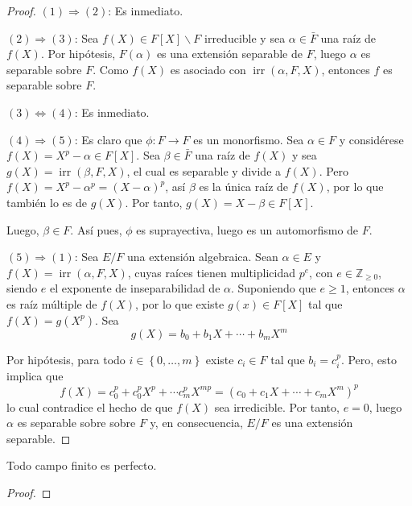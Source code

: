 \documentclass[12pt]{report}
\newcommand{\cf}[3]{\ensuremath{#1:#2\rightarrow#3}}
\theoremstyle{largebreak}
\DeclareMathOperator{\irr}{irr}
\begin{document}
    \begin{proof}
        $(1)\Rightarrow(2)$: Es inmediato.
        
        $(2)\Rightarrow(3)$: Sea $f(X)\in F[X]\backslash F$ irreducible y sea $\alpha\in\bar{F}$ una raíz de $f(X)$. Por hipótesis, $F(\alpha)$ es una extensión separable de $F$, luego $\alpha$ es separable sobre $F$. Como $f(X)$ es asociado con $\irr(\alpha, F, X)$, entonces $f$ es separable sobre $F$.

        $(3)\iff(4)$: Es inmediato.

        $(4)\Rightarrow(5)$: Es claro que $\cf{\phi}{F}{F}$ es un monorfismo. Sea $\alpha\in F$ y considérese $f(X)=X^p-\alpha\in F[X]$. Sea $\beta\in\bar{F}$ una raíz de $f(X)$ y sea $g(X)=\irr(\beta,F,X)$, el cual es separable y divide a $f(X)$. Pero $f(X)=X^p-\alpha^p=(X-\alpha)^p$, así $\beta$ es la única raíz de $f(X)$, por lo que también lo es de $g(X)$. Por tanto, $g(X)=X-\beta\in F[X]$.

        Luego, $\beta\in F$. Así pues, $\phi$ es suprayectiva, luego es un automorfismo de $F$.

        $(5)\Rightarrow(1)$: Sea $E/F$ una extensión algebraica. Sean $\alpha\in E$ y $f(X)=\irr(\alpha, F, X)$, cuyas raíces tienen multiplicidad $p^e$, con $e\in\mathbb{Z}_{\geq0}$, siendo $e$ el exponente de inseparabilidad de $\alpha$. Suponiendo que $e\geq1$, entonces $\alpha$ es raíz múltiple de $f(X)$, por lo que existe $g(x)\in F[X]$ tal que $f(X)=g(X^p)$. Sea
        \begin{equation*}
            g(X)=b_0+b_1X+\cdots+b_mX^m
        \end{equation*}
        
        Por hipótesis, para todo $i\in\left\{0,\dots,m\right\}$ existe $c_i\in F$ tal que $b_i=c_i^p$. Pero, esto implica que
        \begin{equation*}
            f(X)=c_0^p+c_0^pX^p+\cdots c_m^pX^{mp}=\left(c_0+c_1X+\cdots+c_mX^m\right)^p
        \end{equation*}
        lo cual contradice el hecho de que $f(X)$ sea irredicible. Por tanto, $e=0$, luego $\alpha$ es separable sobre sobre $F$ y, en consecuencia, $E/F$ es una extensión separable.
    \end{proof}

    \begin{theor}
        Todo campo finito es perfecto.
    \end{theor}

    \begin{proof}
        
    \end{proof}
\end{document}
